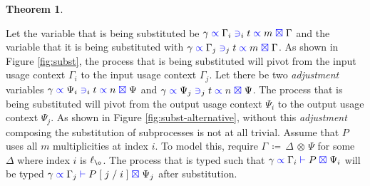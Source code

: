 \documentclass[a4paper,UKenglish,cleveref, autoref, thm-restate,authorcolumns]{lipics-v2019}
\theoremstyle{definition}
\newtheorem{nitheorem}[theorem]{Theorem}
\newcommand{\type}[1]{\textcolor{blue}{\operatorname{#1}}}
\newcommand{\subst}[3]{#1 \; [ \; #2 \; / \;#3 \;]}
\newcommand{\opctx}[3]{#1 \, \coloneqq \, #2 \, \otimes \, #3}
\newcommand{\types}[4]{#1 \; \type{\propto} \; #2 \; \type{\vdash} \; #3 \; \type{\boxtimes} \; #4}
\newcommand{\contains}[6]{#1 \; \type{\propto} \; #2 \; \type{\ni}_{#3} \; #4 \; \type{\propto} \; #5 \; \type{\boxtimes} \; #6}
\begin{document}
\begin{nitheorem}
  \label{thm:subst-generalization}

  Let the variable that is being substituted be $\contains{\gamma}{\Gamma_i}{i}{t}{m}{\Gamma}$ and the variable that it is being substituted with $\contains{\gamma}{\Gamma_j}{j}{t}{m}{\Gamma}$.
  As shown in Figure \ref{fig:subst}, the process that is being substituted will pivot from the input usage context $\Gamma_i$ to the input usage context $\Gamma_j$.
  Let there be two \emph{adjustment} variables $\contains{\gamma}{\Psi_i}{i}{t}{n}{\Psi}$ and $\contains{\gamma}{\Psi_j}{j}{t}{n}{\Psi}$.
  The process that is being substituted will pivot from the output usage context $\Psi_i$ to the output usage context $\Psi_j$.
  As shown in Figure \ref{fig:subst-alternative}, without this \emph{adjustment} composing the substitution of subprocesses is not at all trivial.
  Assume that $P$ uses all $m$ multiplicities at index $i$.
  To model this, require $\opctx{\Gamma}{\Delta}{\Psi}$ for some $\Delta$ where index $i$ is $\ell_{\o}$.
  The process that is typed such that $\types{\gamma}{\Gamma_i}{P}{\Psi_i}$ will be typed $\types{\gamma}{\Gamma_j}{\subst{P}{j}{i}}{\Psi_j}$ after substitution.
\end{nitheorem}
\end{document}
